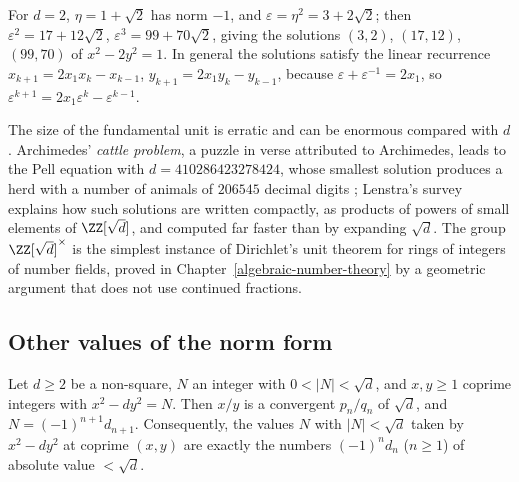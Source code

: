 \begin{example}\label{continued-fractions:example-pell-group}
For $d = 2$, $\eta = 1 + \sqrt2$ has norm $-1$, and $\varepsilon = \eta^2 = 3 + 2\sqrt2$; then $\varepsilon^2 = 17 + 12\sqrt2$, $\varepsilon^3 = 99 + 70\sqrt2$, giving the solutions $(3, 2)$, $(17, 12)$,
$(99, 70)$ of $x^2 - 2y^2 = 1$. In general the solutions satisfy the linear recurrence $x_{k+1} = 2x_1x_k - x_{k-1}$, $y_{k+1} = 2x_1y_k - y_{k-1}$, because $\varepsilon + \varepsilon^{-1} = 2x_1$, so
$\varepsilon^{k+1} = 2x_1\varepsilon^k - \varepsilon^{k-1}$.
\end{example}

\begin{remark}\label{continued-fractions:remark-cattle}
The size of the fundamental unit is erratic and can be enormous compared with $d$. Archimedes' \emph{cattle problem}, a puzzle in verse attributed to Archimedes, leads to the Pell equation with
$d = 410286423278424$, whose smallest solution produces a herd with a number of animals of $206545$ decimal digits \cite{lenstra-pell}; Lenstra's survey explains how such solutions are written
compactly, as products of powers of small elements of $\ZZ[\sqrt d]$, and computed far faster than by expanding $\sqrt d$. The group $\ZZ[\sqrt d]^\times$ is the simplest
instance of Dirichlet's unit theorem for rings of integers of number fields, proved in Chapter~\ref{algebraic-number-theory} by a geometric argument that does not use continued fractions.
\end{remark}

\subsection{Other values of the norm form}\label{continued-fractions:subsection-generalised-pell}

\begin{proposition}\label{continued-fractions:proposition-small-norms}
Let $d \geq 2$ be a non-square, $N$ an integer with $0 < |N| < \sqrt d$, and $x, y \geq 1$ coprime integers with $x^2 - dy^2 = N$. Then $x/y$ is a convergent $p_n/q_n$ of $\sqrt d$, and
$N = (-1)^{n+1}d_{n+1}$. Consequently, the values $N$ with $|N| < \sqrt d$ taken by $x^2 - dy^2$ at coprime $(x, y)$ are exactly the numbers $(-1)^nd_n$ ($n \geq 1$) of absolute value $< \sqrt d$.
\end{proposition}

